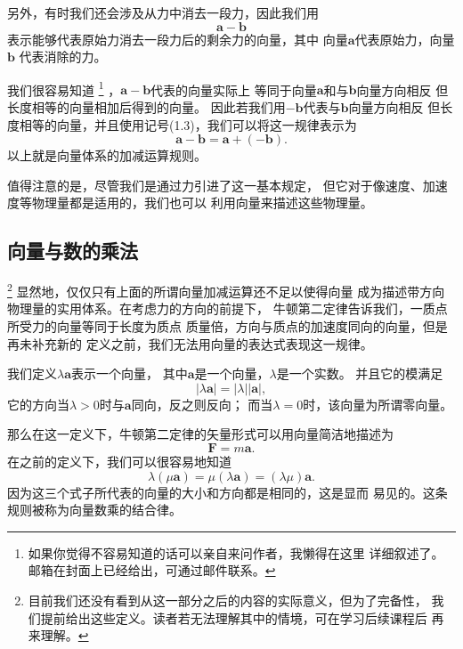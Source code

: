 另外，有时我们还会涉及从力中消去一段力，因此我们用 
\begin{equation}
    \boldsymbol{a}-\boldsymbol{b}
\end{equation}
表示能够代表原始力消去一段力后的剩余力的向量，其中
向量$\boldsymbol{a}$代表原始力，向量$\boldsymbol{b}$
代表消除的力。

我们很容易知道
\footnote{如果你觉得不容易知道的话可以亲自来问作者，我懒得在这里
详细叙述了。邮箱在封面上已经给出，可通过邮件联系。}
，$\boldsymbol{a}-\boldsymbol{b}$代表的向量实际上
等同于向量$\boldsymbol{a}$和与$\boldsymbol{b}$向量方向相反
但长度相等的向量相加后得到的向量。
因此若我们用$-\boldsymbol{b}$代表与$\boldsymbol{b}$向量方向相反
但长度相等的向量，并且使用记号(1.3)，我们可以将这一规律表示为 
\begin{equation}
    \boldsymbol{a}-\boldsymbol{b}
    =\boldsymbol{a}+(-\boldsymbol{b}).
\end{equation}
以上就是向量体系的加减运算规则。

值得注意的是，尽管我们是通过力引进了这一基本规定，
但它对于像速度、加速度等物理量都是适用的，我们也可以
利用向量来描述这些物理量。

\subsection{向量与数的乘法}\footnote{
    目前我们还没有看到从这一部分之后的内容的实际意义，但为了完备性，
    我们提前给出这些定义。读者若无法理解其中的情境，可在学习后续课程后
    再来理解。
}
显然地，仅仅只有上面的所谓向量加减运算还不足以使得向量
成为描述带方向物理量的实用体系。在考虑力的方向的前提下，
牛顿第二定律告诉我们，一质点所受力的向量等同于长度为质点
质量倍，方向与质点的加速度同向的向量，但是再未补充新的
定义之前，我们无法用向量的表达式表现这一规律。

\begin{definition}
    我们定义$\lambda \boldsymbol{a}$表示一个向量，
    其中$\boldsymbol{a}$是一个向量，$\lambda$是一个实数。
    并且它的模满足
    \begin{equation}
        | \lambda \boldsymbol{a}|= |\lambda  | |\boldsymbol{a}|,
    \end{equation}
    它的方向当$\lambda >0$时与$\boldsymbol{a}$同向，反之则反向；
    而当$\lambda =0$时，该向量为所谓零向量。
\end{definition}

那么在这一定义下，牛顿第二定律的矢量形式可以用向量简洁地描述为 
\begin{equation}
    \boldsymbol{F}=m\boldsymbol{a}.
\end{equation}
在之前的定义下，我们可以很容易地知道
\begin{equation}
    \lambda(\mu\boldsymbol{a})=\mu(\lambda\boldsymbol{a})
    =(\lambda \mu)\boldsymbol{a}.
\end{equation}
因为这三个式子所代表的向量的大小和方向都是相同的，这是显而
易见的。这条规则被称为向量数乘的结合律。

